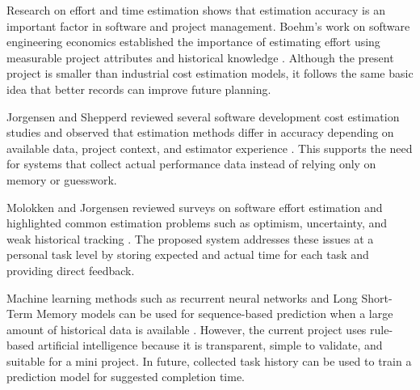 \begin{justify}
Research on effort and time estimation shows that estimation accuracy is an important factor in software and project management. Boehm's work on software engineering economics established the importance of estimating effort using measurable project attributes and historical knowledge \cite{boehm1981software}. Although the present project is smaller than industrial cost estimation models, it follows the same basic idea that better records can improve future planning.

Jorgensen and Shepperd reviewed several software development cost estimation studies and observed that estimation methods differ in accuracy depending on available data, project context, and estimator experience \cite{jorgensen2007forecasting}. This supports the need for systems that collect actual performance data instead of relying only on memory or guesswork.

Molokken and Jorgensen reviewed surveys on software effort estimation and highlighted common estimation problems such as optimism, uncertainty, and weak historical tracking \cite{molokken2003review}. The proposed system addresses these issues at a personal task level by storing expected and actual time for each task and providing direct feedback.

Machine learning methods such as recurrent neural networks and Long Short-Term Memory models can be used for sequence-based prediction when a large amount of historical data is available \cite{hochreiter1997lstm}. However, the current project uses rule-based artificial intelligence because it is transparent, simple to validate, and suitable for a mini project. In future, collected task history can be used to train a prediction model for suggested completion time.
\end{justify}
